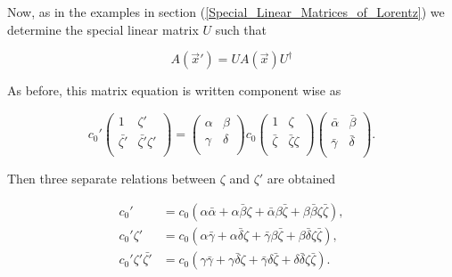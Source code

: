 \noindent Now, as in the examples in section (\ref{Special_Linear_Matrices_of_Lorentz}) we determine the special linear matrix $U$ such that

\begin{equation}\label{Ext_Complex_UAU}
A(\vec{x}') = U A(\vec{x}) U^{\dagger}
\end{equation}

\noindent As before, this matrix equation is written component wise as

\begin{equation*}
{c_0}'\left(
\begin{array}{cc}
1           & \zeta' \\ 
\bar{\zeta'} & \bar{\zeta'}\zeta' \\ 
\end{array}
\right)
=
\left(
\begin{array}{cc}
\alpha & \beta \\
\gamma & \delta \\
\end{array}
\right)
{c_0}\left(
\begin{array}{cc}
1           & \zeta \\ 
\bar{\zeta} & \bar{\zeta}\zeta \\ 
\end{array}
\right)
\left(
\begin{array}{cc}
\bar{\alpha} & \bar{\beta} \\
\bar{\gamma} & \bar{\delta} \\
\end{array}
\right).
\end{equation*}

\noindent Then three separate relations between $\zeta$ and $\zeta'$ are obtained

\begin{align}\label{Ext_Complex_zeta_trans_1} 
{c_0}' & = c_0 (\alpha \bar{\alpha} + \alpha \bar{\beta} \zeta + \bar{\alpha} \beta \bar{\zeta} + \beta \bar{\beta} \zeta \bar{\zeta}), \\\label{Ext_Complex_zeta_trans_2} 
{c_0}'\zeta' & = c_0 (\alpha \bar{\gamma} + \alpha \bar{\delta} \zeta + \bar{\gamma} \beta \bar{\zeta} + \beta \bar{\delta} \zeta \bar{\zeta}), \\\label{Ext_Complex_zeta_trans_3} 
{c_0}'\zeta'\bar{\zeta'} & = c_0 (\gamma \bar{\gamma} + \gamma \bar{\delta} \zeta + \bar{\gamma} \delta \bar{\zeta} + \delta \bar{\delta} \zeta \bar{\zeta}). 
\end{align} 

